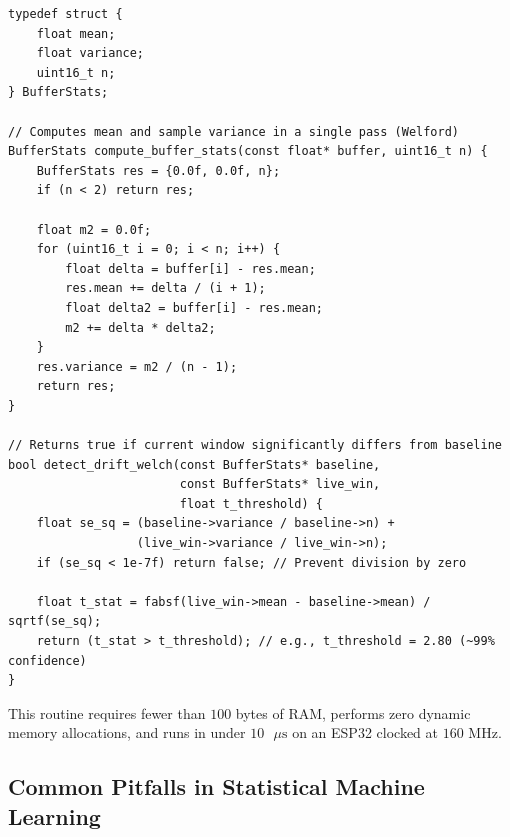 \begin{iotbox}
\begin{lstlisting}[style=pythonstyle]
typedef struct {
    float mean;
    float variance;
    uint16_t n;
} BufferStats;

// Computes mean and sample variance in a single pass (Welford)
BufferStats compute_buffer_stats(const float* buffer, uint16_t n) {
    BufferStats res = {0.0f, 0.0f, n};
    if (n < 2) return res;
    
    float m2 = 0.0f;
    for (uint16_t i = 0; i < n; i++) {
        float delta = buffer[i] - res.mean;
        res.mean += delta / (i + 1);
        float delta2 = buffer[i] - res.mean;
        m2 += delta * delta2;
    }
    res.variance = m2 / (n - 1);
    return res;
}

// Returns true if current window significantly differs from baseline
bool detect_drift_welch(const BufferStats* baseline, 
                        const BufferStats* live_win, 
                        float t_threshold) {
    float se_sq = (baseline->variance / baseline->n) + 
                  (live_win->variance / live_win->n);
    if (se_sq < 1e-7f) return false; // Prevent division by zero
    
    float t_stat = fabsf(live_win->mean - baseline->mean) / sqrtf(se_sq);
    return (t_stat > t_threshold); // e.g., t_threshold = 2.80 (~99% confidence)
}
\end{lstlisting}
This routine requires fewer than $100$ bytes of RAM, performs zero dynamic memory allocations, and runs in under $10\text{ }\mu\text{s}$ on an ESP32 clocked at $160\text{ MHz}$.
\end{iotbox}

\subsection{Common Pitfalls in Statistical Machine Learning}\label{subsec:stat_pitfalls}

